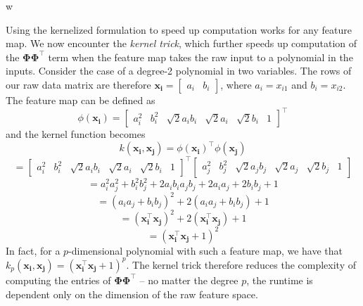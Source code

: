 w\documentclass{article}
\begin{document}
Using the kernelized formulation to speed up computation works for any feature map. We now encounter the \textit{kernel trick}, which further speeds up computation of the $\mathbf{\Phi\Phi^{\top}}$ term when the feature map takes the raw input to a polynomial in the inputs. Consider the case of a degree-2 polynomial in two variables. The rows of our raw data matrix are therefore $\mathbf{x_i} = \begin{bmatrix} a_i & b_i \end{bmatrix}$, where $a_i = x_{i1}$ and $b_i = x_{i2}$. The feature map can be defined as $$\phi(\mathbf{x_i}) = \begin{bmatrix} a_i^2 & b_i^2 & \sqrt{2}a_ib_i & \sqrt{2}a_i & \sqrt{2}b_i & 1 \end{bmatrix}^{\top}$$ and the kernel function becomes $$k(\mathbf{x_i, x_j}) = \phi(\mathbf{x_i})^{\top}\phi(\mathbf{x_j})$$ $$= \begin{bmatrix} a_i^2 & b_i^2 & \sqrt{2}a_ib_i & \sqrt{2}a_i & \sqrt{2}b_i & 1 \end{bmatrix}^{\top}\begin{bmatrix} a_j^2 & b_j^2 & \sqrt{2}a_jb_j & \sqrt{2}a_j & \sqrt{2}b_j & 1 \end{bmatrix}$$ $$ = a_i^2a_j^2 + b_i^2b_j^2 + 2a_ib_ia_jb_j + 2a_ia_j + 2 b_ib_j + 1$$ $$ =(a_ia_j + b_ib_j)^2 + 2(a_ia_j + b_ib_j) + 1$$ $$=(\mathbf{x_i^{\top}x_j})^2 + 2(\mathbf{x_i^{\top}x_j}) + 1$$ $$=(\mathbf{x_i^{\top}x_j} + 1)^2$$ In fact, for a $p$-dimensional polynomial with such a feature map, we have that $k_p(\mathbf{x_i, x_j}) = (\mathbf{x_i^{\top}x_j} + 1)^p$. The kernel trick therefore reduces the complexity of computing the entries of $\mathbf{\Phi\Phi^{\top}}$ -- no matter the degree $p$, the runtime is dependent only on the dimension of the raw feature space.

\clearpage
\end{document}
